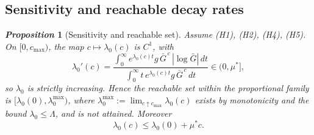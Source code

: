 \documentclass[letterpaper, 10pt, conference]{ieeeconf}
\newtheorem{proposition}{\it \textbf{Proposition}}
\newcommand{\Lbar}{\Lambda}
\newcommand{\rev}[1]{#1}
\newcommand{\ed}[1]{#1}
\begin{document}
\subsection{\rev{Sensitivity and reachable decay rates}}
\label{sec:sens}
\begin{proposition}[Sensitivity and reachable set]
\label{prop:sens}
\ed{Assume {\rm(H1), (H2), (H4), (H5)}.} On $[0,c_{\max})$, the map
$c\mapsto\lambda_0(c)$ is $C^1$, with
\begin{equation}
\lambda_0'(c)=
\frac{\displaystyle\int_0^\infty e^{\lambda_0(c)t}g\,\bar G^{\,c}\,|\log\bar G|\,dt}
{\displaystyle\int_0^\infty t\,e^{\lambda_0(c)t}g\,\bar G^{\,c}\,dt}
\in(0,\mu^\ast],
\label{eq:dlam}
\end{equation}
so $\lambda_0$ is strictly increasing. \rev{Hence the reachable set within the
proportional family is $[\lambda_0(0),\lambda_0^{\max})$, where
$\lambda_0^{\max}:=\lim_{c\uparrow c_{\max}}\lambda_0(c)$ exists by monotonicity
and the bound $\lambda_0\le\Lbar$, and is not attained. Moreover}
\begin{equation}\label{lambda_0}
\lambda_0(c)\le\lambda_0(0)+\mu^\ast c.
\end{equation}
\end{proposition}
\end{document}
